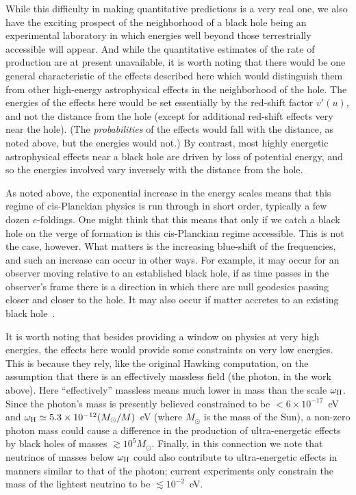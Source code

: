 \documentclass[12pt]{article}
\begin{document}
While this difficulty in making quantitative predictions is a very real one, we
also have the exciting prospect of the neighborhood of a black hole being an
experimental laboratory in which energies well beyond those terrestrially
accessible will appear.  And while the quantitative estimates of the rate of
production are at present unavailable, it is worth noting that there would be
one general characteristic of the effects described here which would distinguish
them from other high-energy astrophysical effects in the neighborhood of the
hole.  The energies of the effects here would be set essentially by the
red-shift factor $v'(u)$, and not the distance from the hole
(except for
additional red-shift effects very near the hole).  (The {\em probabilities}
of the effects would fall with the distance, as noted above, but the energies
would not.)  By contrast, most highly energetic astrophysical effects near a
black hole are driven by loss of potential energy, and so the energies involved
vary inversely with the distance from the hole.

As noted above, the exponential increase in the energy scales means that this
regime of cis-Planckian physics is run through in short order, typically a few
dozen $e$-foldings.   One might think that this means that only if we catch a
black hole on the verge of formation is this cis-Planckian regime accessible. 
This is not the case, however.  What matters is the increasing blue-shift of
the frequencies, and such an increase  can occur in other ways.  For example,
it may occur for an observer moving relative to an established black hole, if
as time passes in the observer's frame there is a direction in which there are
null geodesics passing closer and closer to the hole. It may also occur if
matter accretes to an existing black hole~\cite{Helfer:2001}.

It is worth noting that besides providing a window on physics at very high
energies, the effects here would provide some constraints on very low
energies.  This is because they rely, like the original Hawking computation, on
the assumption that there is an effectively massless field (the photon, in the
work above).   Here ``effectively'' massless means much lower in mass than the
scale $\omega _{\rm H}$.  Since the photon's mass is presently believed
constrained to be $<6\times 10^{-17}$~eV \cite{Eidelman:2004} and $\omega _{\rm
H}\simeq 5.3\times 10^{-12} (M_\odot /M)$~eV (where $M_\odot$ is the mass of
the Sun), a non-zero photon mass could cause a difference in the production of 
ultra-energetic effects by black holes of masses $\gtrsim 10^5 M_\odot$. 
Finally, in this connection we note that neutrinos of masses below $\omega
_{\rm H}$ could also contribute to ultra-energetic effects in manners similar
to that of the photon; current experiments only constrain the mass of the
lightest neutrino to be $\lesssim 10^{-2}$~eV.
\end{document}
